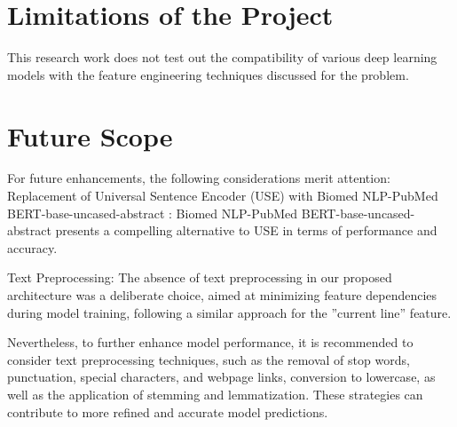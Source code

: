 \documentclass[12pt,a4paper]{report}     %
\begin{document}
\begin{normalsize}
{{{\section{Limitations of the Project}
This research work does not test out the compatibility of various deep learning models with the feature engineering techniques discussed for the problem.
\section{Future Scope}
 For future enhancements, the following considerations merit attention: Replacement of Universal Sentence Encoder (USE) with Biomed NLP-PubMed BERT-base-uncased-abstract : Biomed NLP-PubMed BERT-base-uncased-abstract presents a compelling alternative to USE in terms of performance and accuracy.

Text Preprocessing: The absence of text preprocessing in our proposed architecture was a deliberate choice, aimed at minimizing feature dependencies during model training, following a similar approach for the ”current line” feature. 

Nevertheless, to further enhance model performance, it is recommended to consider text preprocessing techniques, such as the removal of stop words, punctuation, special characters, and webpage links, conversion to lowercase, as well as the application of stemming and lemmatization. These strategies can contribute to more refined and accurate model predictions. 


}



\newpage
{}

\begin{normalsize}
				{\setlength{\baselineskip}{1.1\baselineskip}
{
\begin{thebibliography}{9}


\end{thebibliography}}}
\end{normalsize}}}
\end{normalsize}
\end{document}
